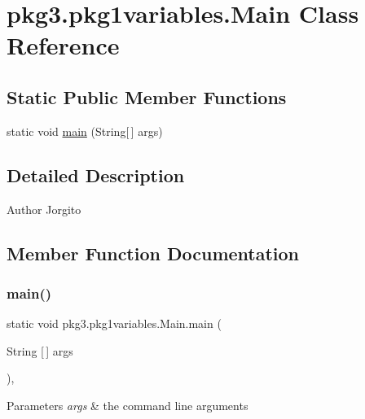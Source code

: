 \hypertarget{classpkg3_1_1pkg1variables_1_1_main}{}\section{pkg3.\+pkg1variables.\+Main Class Reference}
\label{classpkg3_1_1pkg1variables_1_1_main}
\subsection*{Static Public Member Functions}
\begin{DoxyCompactItemize}
\item 
static void \mbox{\hyperlink{classpkg3_1_1pkg1variables_1_1_main_afd79a5429e7488e5398621f5dd40bb62}{main}} (String\mbox{[}$\,$\mbox{]} args)
\end{DoxyCompactItemize}


\subsection{Detailed Description}
\begin{DoxyAuthor}{Author}
Jorgito 
\end{DoxyAuthor}


\subsection{Member Function Documentation}
\mbox{\label{classpkg3_1_1pkg1variables_1_1_main_afd79a5429e7488e5398621f5dd40bb62}} 
\subsubsection{\texorpdfstring{main()}{main()}}
{\footnotesize\ttfamily static void pkg3.\+pkg1variables.\+Main.\+main (\begin{DoxyParamCaption}\item[{String \mbox{[}$\,$\mbox{]}}]{args }\end{DoxyParamCaption})\hspace{0.3cm}{\ttfamily [inline]}, {\ttfamily [static]}}


\begin{DoxyParams}{Parameters}
{\em args} & the command line arguments \\
\hline
\end{DoxyParams}


